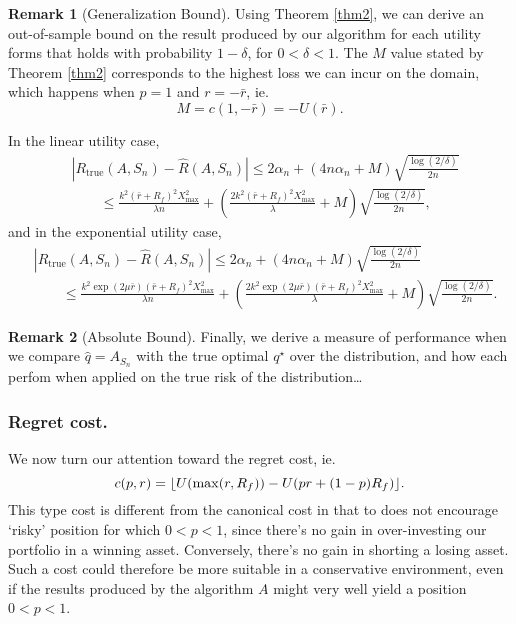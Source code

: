 \documentclass[11pt]{article}
\DeclarePairedDelimiter\floor{\lfloor}{\rfloor}
\theoremstyle{plain}
\theoremstyle{definition}
\newtheorem*{rem}{Remark}
\begin{document}
\begin{rem}[Generalization Bound]
  Using Theorem \ref{thm2}, we can derive an out-of-sample bound on the result produced by
  our algorithm for each utility forms that holds with probability $1-\delta$, for
  $0<\delta<1$. The $M$ value stated by Theorem \ref{thm2} corresponds to the highest loss
  we can incur on the domain, which happens when $p=1$ and $r=-\bar r$, ie.
  \begin{equation}
    M = c(1,-\bar r) = -U(\bar r).
  \end{equation}

  In the linear utility case, 
  \begin{align}
    &|R_{\mathrm{true}}(A,S_n) - \hat{R}(A,S_n)| \leq 2\alpha_n + (4n\alpha_n +
      M)\sqrt{\frac{\log(2/\delta)}{2n}}\\
    &\qquad \leq \frac{k^2(\bar r+R_f)^2X^2_{\max}}{\lambda n} + \left(\frac{2k^2(\bar r+R_f)^2X^2_{\max}}{\lambda} + M\right)\sqrt{\frac{\log(2/\delta)}{2n}},
  \end{align}
  and in the exponential utility case, 
  \begin{align}
    &|R_{\mathrm{true}}(A,S_n) - \hat{R}(A,S_n)| \leq 2\alpha_n + (4n\alpha_n +
      M)\sqrt{\frac{\log(2/\delta)}{2n}}\\
    &\qquad \leq \frac{k^2 \exp(2\mu\bar r)(\bar r + R_f)^2 X^2_{\max}}{\lambda n} + \left(\frac{2k^2 \exp(2\mu\bar r)(\bar r + R_f)^2 X^2_{\max}}{\lambda} + M\right)\sqrt{\frac{\log(2/\delta)}{2n}}.
  \end{align}
\end{rem}

\begin{rem}[Absolute Bound]
  Finally, we derive a measure of performance when we compare $\hat q=A_{S_n}$ with the true
  optimal $q^\star$ over the distribution, and how each perfom when applied on the true
  risk of the distribution\ldots
\end{rem}

\subsubsection{Regret cost.}

We now turn our attention toward the regret cost, ie.
\begin{equation}
  c(p,r) = \floor{U(\max(r,R_f)) - U(pr + (1-p)R_f)}.
\end{equation}
This type cost is different from the canonical cost in that to does not encourage `risky'
position for which $0<p<1$, since there's no gain in over-investing our portfolio in a
winning asset. Conversely, there's no gain in shorting a losing asset. Such a cost could
therefore be more suitable in a conservative environment, even if the results produced by
the algorithm $A$ might very well yield a position $0<p<1$.
\end{document}
